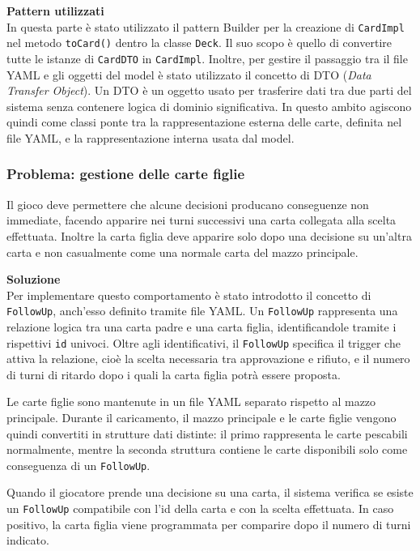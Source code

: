 \documentclass[11pt, a4paper, oneside]{report}
\begin{document}
\textbf{Pattern utilizzati} \\
In questa parte è stato utilizzato il pattern Builder per la creazione di \texttt{CardImpl} nel metodo \texttt{toCard()} dentro la classe \texttt{Deck}.
Il suo scopo è quello di convertire tutte le istanze di \texttt{CardDTO} in \texttt{CardImpl}.
Inoltre, per gestire il passaggio tra il file YAML e gli oggetti del model è stato utilizzato il concetto di DTO (\emph{Data Transfer Object}). 
Un DTO è un oggetto usato per trasferire dati tra due parti del sistema senza contenere logica di dominio significativa. 
In questo ambito agiscono quindi come classi ponte tra la rappresentazione esterna delle carte, definita nel file YAML, e la rappresentazione interna usata dal model. 

\subsubsection{Problema: gestione delle carte figlie}

Il gioco deve permettere che alcune decisioni producano conseguenze non immediate, facendo apparire nei turni successivi una carta collegata alla scelta effettuata. 
Inoltre la carta figlia deve apparire solo dopo una decisione su un'altra carta e non casualmente come una normale carta del mazzo principale.

\textbf{Soluzione} \\
Per implementare questo comportamento è stato introdotto il concetto di \texttt{FollowUp}, anch'esso definito tramite file YAML. 
Un \texttt{FollowUp} rappresenta una relazione logica tra una carta padre e una carta figlia, identificandole tramite i rispettivi \texttt{id} univoci. 
Oltre agli identificativi, il \texttt{FollowUp} specifica il trigger che attiva la relazione, cioè la scelta necessaria tra approvazione e rifiuto, e il numero di turni di ritardo dopo i quali la carta figlia potrà essere proposta.

Le carte figlie sono mantenute in un file YAML separato rispetto al mazzo principale. 
Durante il caricamento, il mazzo principale e le carte figlie vengono quindi convertiti in strutture dati distinte: il primo rappresenta le carte pescabili normalmente, mentre la seconda struttura contiene le carte disponibili solo come conseguenza di un \texttt{FollowUp}.

Quando il giocatore prende una decisione su una carta, il sistema verifica se esiste un \texttt{FollowUp} compatibile con l'id della carta e con la scelta effettuata. 
In caso positivo, la carta figlia viene programmata per comparire dopo il numero di turni indicato. 
\end{document}
